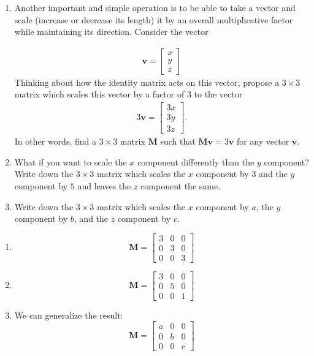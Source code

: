\begin{prob}
\begin{enumerate}
\item Another important and simple operation is to be able to take a vector and scale (increase or decrease its length) it by an overall multiplicative factor while maintaining its direction. Consider the vector

    \begin{align*}
    \mathbf{v} = \begin{bmatrix}
    x\\y\\z
    \end{bmatrix}
    \end{align*}
    Thinking about how the identity matrix acts on this vector, propose a $3\times 3$ matrix which scales this vector by a factor of $3$ to the vector
    \begin{align*}
    3\mathbf{v} = \begin{bmatrix}
    3x\\3y\\3z
    \end{bmatrix}.
    \end{align*}
    In other words, find a $3 \times 3$ matrix $\mathbf{M}$ such that $\mathbf{Mv} = 3\mathbf{v}$ for any vector $\mathbf{v}$.
\item  What if you want to scale the $x$ component differently than the $y$ component?  Write down the $3\times 3$ matrix which scales the $x$ component by $3$ and the $y$ component by $5$ and leaves the $z$ component the same.
\item Write down the $3 \times 3$ matrix which scales the $x$ component by $a$, the $y$ component by $b$, and the $z$ component by $c$.
\end{enumerate}
\end{prob}

\begin{sol}
\begin{enumerate}
    \item \[ \mathbf{M} = \left[\begin{array}{rrr} 3 & 0 & 0 \\ 0 & 3 & 0 \\ 0 & 0 & 3 \end{array}\right] \]
    \item \[ \mathbf{M} = \left[\begin{array}{rrr} 3 & 0 & 0 \\ 0 & 5 & 0 \\ 0 & 0 & 1 \end{array}\right] \]
    \item We can generalize the result: \[ \mathbf{M} = \left[\begin{array}{rrr} a & 0 & 0 \\ 0 & b & 0 \\ 0 & 0 & c \end{array}\right] \]
\end{enumerate}
\end{sol}

